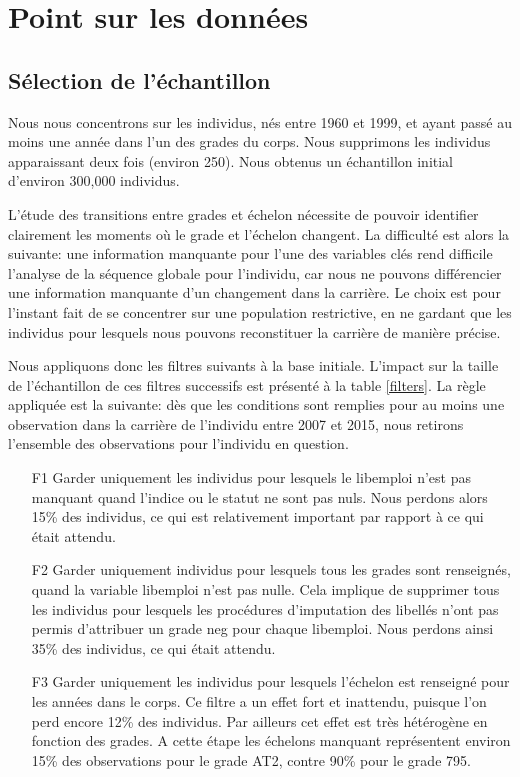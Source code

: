 \documentclass[11pt,a4paper]{article}
\begin{document}
\section{Point sur les données} \label{data}


\subsection{Sélection de l'échantillon}

Nous nous concentrons sur les individus, nés entre 1960 et 1999, et ayant passé au moins une année dans l'un des grades du corps. Nous supprimons les individus apparaissant deux fois (environ 250). Nous obtenus un échantillon initial d'environ 300,000 individus. 

L'étude des transitions entre grades et échelon nécessite de pouvoir identifier clairement les moments où le grade et l'échelon changent. La difficulté est alors la suivante: une information manquante pour l'une des variables clés rend difficile l'analyse de la séquence globale pour l'individu, car nous ne pouvons différencier une information manquante d'un changement dans la carrière. Le choix est pour l'instant fait de se concentrer sur une population restrictive, en ne gardant que les individus pour lesquels nous pouvons reconstituer la carrière de manière précise. 

Nous appliquons donc les filtres suivants à la base initiale. L'impact sur la taille de l'échantillon de ces filtres successifs est présenté à la table \ref{filters}. La règle appliquée est la suivante: dès que les conditions sont remplies pour au moins une observation dans la carrière de l'individu entre 2007 et 2015, nous retirons l'ensemble des observations pour l'individu en question. 
\begin{enumerate}[leftmargin=1cm ,parsep=0cm,itemsep=0cm,topsep=0cm] 
\item[F1] Garder uniquement les individus pour lesquels le libemploi n'est pas manquant quand l'indice ou le statut ne sont pas nuls. Nous perdons alors 15\% des individus, ce qui est relativement important par rapport à ce qui était attendu. 
\item[F2] Garder uniquement individus pour lesquels tous les grades sont renseignés, quand la variable libemploi n'est pas nulle. Cela implique de supprimer tous les individus pour lesquels les procédures d'imputation des libellés n'ont pas permis d'attribuer un grade neg pour chaque libemploi. Nous perdons ainsi 35\% des individus, ce qui était attendu. 
\item[F3] Garder uniquement les individus pour lesquels l'échelon est renseigné pour les années dans le corps. Ce filtre a un effet fort et inattendu, puisque l'on perd encore 12\% des individus. Par ailleurs cet effet est très hétérogène en fonction des grades. A cette étape les échelons manquant représentent environ 15\% des observations pour le grade AT2, contre 90\% pour le grade 795.
\end{enumerate}
\end{document}
